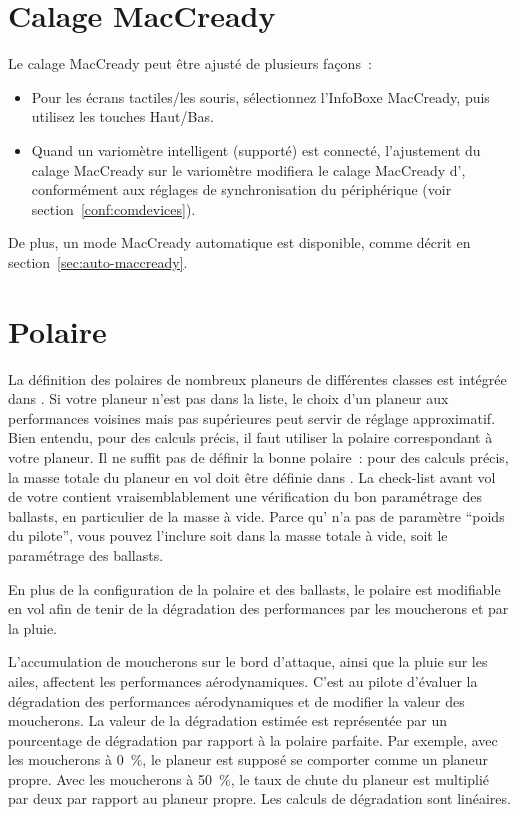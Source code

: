 \section{Calage MacCready}

Le calage MacCready peut être ajusté de plusieurs façons~:
\begin{itemize}
\item Pour les écrans tactiles/les souris, sélectionnez l'InfoBoxe MacCready, puis utilisez les touches Haut/Bas.
\item Quand un variomètre intelligent (supporté) est connecté, l'ajustement du calage MacCready sur le variomètre modifiera le calage MacCready d'\xc, conformément aux réglages de synchronisation du périphérique (voir section~\ref{conf:comdevices}).
\end{itemize}
De plus, un mode MacCready automatique est disponible, comme décrit en section~\ref{sec:auto-maccready}.


\section{Polaire}\label{sec:glidepolar}

La définition des polaires de nombreux planeurs de différentes classes est intégrée dans \xc.
Si votre planeur n'est pas dans la liste, le choix d'un planeur aux performances voisines mais pas supérieures peut servir de réglage approximatif. 
Bien entendu, pour des calculs précis, il faut utiliser la polaire correspondant à votre planeur.
Il ne suffit pas de définir la bonne polaire~: pour des calculs précis, la masse totale du planeur en vol doit être définie dans \xc.
La check-list avant vol de votre \xc{} contient vraisemblablement une vérification du bon paramétrage des ballasts, en particulier de la masse à vide.
Parce qu'\xc{} n'a pas de paramètre ``poids du pilote'', vous pouvez l'inclure soit dans la masse totale à vide, soit le paramétrage des ballasts.

En plus de la configuration de la polaire et des ballasts, le polaire est modifiable en vol afin de tenir de la dégradation des performances par les moucherons et par la pluie.

L'accumulation de moucherons sur le bord d'attaque, ainsi que la pluie sur les ailes, affectent les performances aérodynamiques.
C'est au pilote d'évaluer la dégradation des performances aérodynamiques et de modifier la valeur des moucherons.
La valeur de la dégradation estimée est représentée par un pourcentage de dégradation par rapport à la polaire parfaite.
Par exemple, avec les moucherons à 0~\%, le planeur est supposé se comporter comme un planeur propre.
Avec les moucherons à 50~\%, le taux de chute du planeur est multiplié par deux par rapport au planeur propre.
Les calculs de dégradation sont linéaires.

